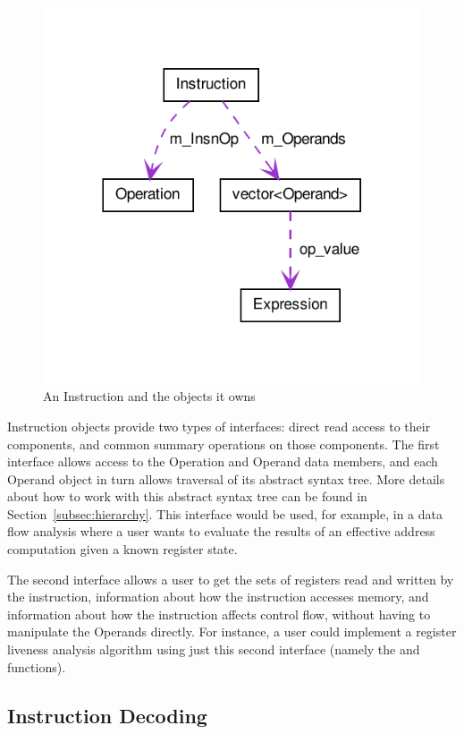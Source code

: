 \begin{figure}
\includegraphics{fig/ownership_graph}
\caption{An Instruction and the objects it owns}
\label{fig:ownership-graph}
\end{figure}

Instruction objects provide two types of interfaces: direct read access to their
components, and common summary operations on those components. The first
interface allows access to the Operation and Operand data members, and each
Operand object in turn allows traversal of its abstract syntax tree. More
details about how to work with this abstract syntax tree can be found in
Section~\ref{subsec:hierarchy}.
This interface would be used, for example, in a data flow analysis where a user wants
to evaluate the results of an effective address computation given a known
register state.

The second interface allows a user to get the sets of registers read and written
by the instruction, information about how the instruction accesses memory, and
information about how the instruction affects control flow, without having to
manipulate the Operands directly. For instance, a user could implement a
register liveness analysis algorithm using just this second interface (namely
the  and  functions).

\subsection{Instruction Decoding}

